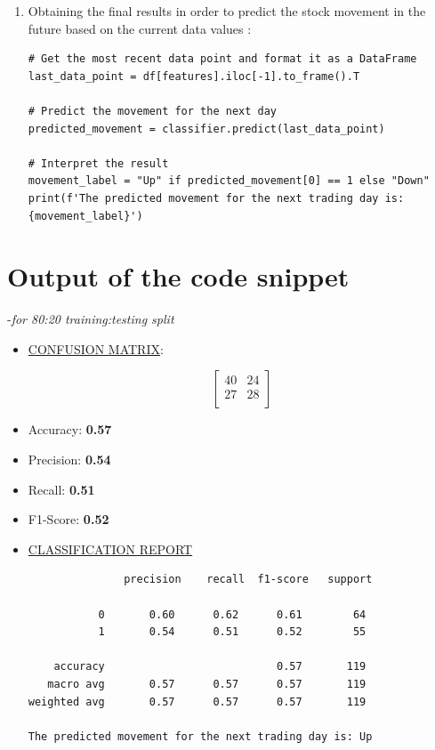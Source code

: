 \documentclass[12pt,a4paper]{report}
\begin{document}
\begin{enumerate}
\begin{verbatim}
print(f'Accuracy: {accuracy:.2f}')
print(f'Precision: {precision:.2f}')
print(f'Recall: {recall:.2f}')
print(f'F1-Score: {f1:.2f}')

# Detailed classification report
print("\nClassification Report:\n", classification_report(y_test, y_pred))
    \end{verbatim}
    \item Obtaining the final results in order to predict the stock movement in the future based on the current data values :
    \begin{verbatim}
# Get the most recent data point and format it as a DataFrame
last_data_point = df[features].iloc[-1].to_frame().T

# Predict the movement for the next day
predicted_movement = classifier.predict(last_data_point)

# Interpret the result
movement_label = "Up" if predicted_movement[0] == 1 else "Down"
print(f'The predicted movement for the next trading day is:
{movement_label}')
    \end{verbatim}
\end{enumerate}

\section{Output of the code snippet}-\textit{for 80:20 training:testing split}
\begin{itemize}
    \item \underline{CONFUSION MATRIX}:
    \vspace{-0.5cm}
    \begin{flushleft}
    \[
    \begin{bmatrix}
        40 & 24 \\
        27 & 28 \\
    \end{bmatrix}
    \]
    \end{flushleft}
    \vspace{-0.5cm} %

    \item Accuracy: \textbf{0.57}
    \item Precision: \textbf{0.54}
    \item Recall: \textbf{0.51}
    \item F1-Score: \textbf{0.52}
\newpage
    \item \underline{CLASSIFICATION REPORT}
\begin{verbatim}
               precision    recall  f1-score   support

           0       0.60      0.62      0.61        64
           1       0.54      0.51      0.52        55

    accuracy                           0.57       119
   macro avg       0.57      0.57      0.57       119
weighted avg       0.57      0.57      0.57       119

The predicted movement for the next trading day is: Up
\end{verbatim}
\end{itemize}
\end{document}
